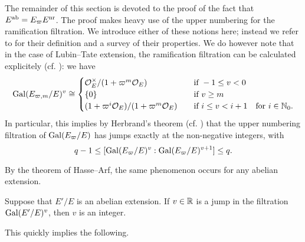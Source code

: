\documentclass[../main.tex]{subfiles}
\begin{document}
The remainder of this section is devoted to the proof of the fact that $E^{\mathrm{ab}} =
E_\varpi E^{\mathrm{nr}}$. 
The proof makes heavy use of the upper numbering for the ramification filtration.
We introduce either of these notions here; instead we refer to \cite[Chapter
IV]{serre2013local} for their definition and a survey of their properties. We
do however note that in the case of Lubin--Tate extension, the ramification
filtration can be calculated explicitely (cf. \cite[Theorem 2]{gold1981local}): we have
\begin{equation}\label{eq:CalculationOfUpperRamificationFiltration}
  \operatorname{Gal}(E_{\varpi, m}/E)^v \cong \begin{cases}
    \mathcal{O}_E^\times/(1 + \varpi^m \mathcal{O}_E) \quad &\text{if } -1 \leq v < 0 \\
    \{0\} \quad &\text{if } v \geq m \\
    (1 + \varpi^i \mathcal{O}_E)/(1+\varpi^m \mathcal{O}_E) \quad &\text{if } i \leq v < i+1
    \quad \text{for } i \in \mathbb{N}_0.
  \end{cases}
\end{equation}
In particular, this implies by Herbrand's theorem (cf. \cite[Ch. 4, Proposition
14]{serre2013local}) that the upper numbering filtration of 
$\operatorname{Gal}(E_\varpi/E)$ has jumps exactly at the non-negative integers, with
\begin{equation*}
  q-1 \leq [\operatorname{Gal}(E_\varpi/E)^{v}: \operatorname{Gal}(E_\varpi/E)^{v+1}] \leq q.
\end{equation*}

By the theorem of Hasse--Arf, the same phenomenon occurs for any abelian extension.
\begin{thm}\label{thm:Hasse--Arf}
  Suppose that $E'/E$ is an abelian extension. If $v \in \mathbb{R}$ is a jump in the 
  filtration $\operatorname{Gal}(E'/E)^v$, then $v$ is an integer.
\end{thm}

This quickly implies the following.
\end{document}
